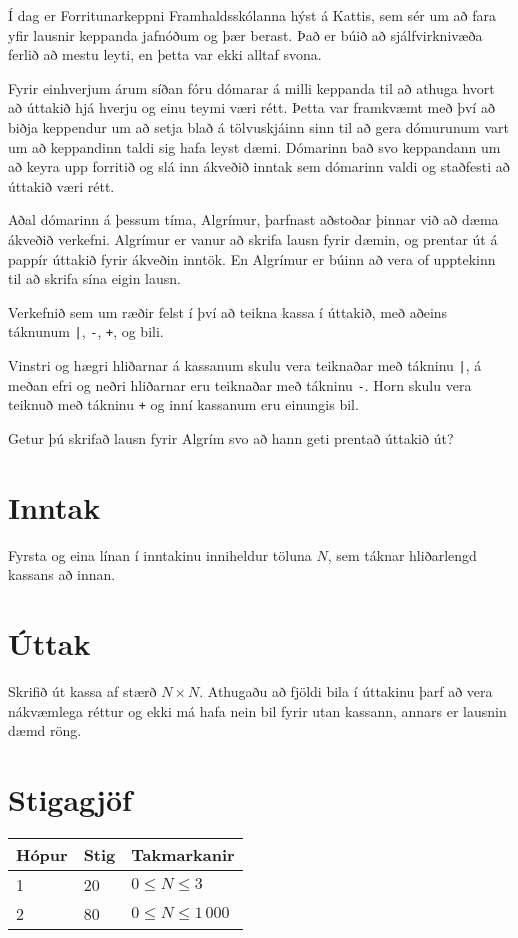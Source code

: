 
Í dag er Forritunarkeppni Framhaldsskólanna hýst á Kattis, sem sér um að fara yfir lausnir keppanda jafnóðum og þær berast.
Það er búið að sjálfvirknivæða ferlið að mestu leyti, en þetta var ekki alltaf svona.

Fyrir einhverjum árum síðan fóru dómarar á milli keppanda til að athuga hvort að úttakið hjá hverju og einu teymi væri rétt.
Þetta var framkvæmt með því að biðja keppendur um að setja blað á tölvuskjáinn sinn til að gera dómurunum vart 
um að keppandinn taldi sig hafa leyst dæmi. Dómarinn bað svo keppandann um að keyra upp forritið og slá inn 
ákveðið inntak sem dómarinn valdi og staðfesti að úttakið væri rétt.

Aðal dómarinn á þessum tíma, Algrímur, þarfnast aðstoðar þinnar við að dæma ákveðið verkefni.
Algrímur er vanur að skrifa lausn fyrir dæmin, og prentar út á pappír úttakið fyrir ákveðin inntök. En Algrímur er búinn
að vera of upptekinn til að skrifa sína eigin lausn.

Verkefnið sem um ræðir felst í því að teikna kassa í úttakið, með aðeins táknunum \texttt{|}, \texttt{-}, \texttt{+}, og bili.

Vinstri og hægri hliðarnar á kassanum skulu vera teiknaðar með tákninu \texttt{|}, á meðan efri og neðri hliðarnar eru teiknaðar með tákninu \texttt{-}.
Horn skulu vera teiknuð með tákninu \texttt{+} og inní kassanum eru einungis bil.

Getur þú skrifað lausn fyrir Algrím svo að hann geti prentað úttakið út?

\section*{Inntak}
Fyrsta og eina línan í inntakinu inniheldur töluna $N$, sem táknar hliðarlengd kassans að innan.

\section*{Úttak}
Skrifið út kassa af stærð $N \times N$.
Athugaðu að fjöldi bila í úttakinu þarf að vera nákvæmlega réttur og ekki má hafa nein bil fyrir utan kassann, annars er lausnin dæmd röng.

\section*{Stigagjöf}
\begin{tabular}{|l|l|l|}
\hline
Hópur & Stig & Takmarkanir \\ \hline
1     & 20   & $0 \leq N \leq 3$ \\ \hline
2     & 80   & $0 \leq N \leq 1\,000$ \\ \hline
\end{tabular}

